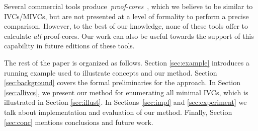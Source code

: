 Several commercial tools produce~\emph{proof-cores}~\cite{hanna2015formal, jasper_gold}, which we believe to be similar to IVCs/MIVCs, but are not presented at a level of formality to perform a precise comparison.  However, to the best of our knowledge, none of these tools offer to calculate \emph{all} proof-cores.  Our work can also be useful towards the support of this capability in future editions of these tools.



The rest of the paper is organized as follows.
Section \ref{sec:example} introduces a running example used to illustrate concepts and our method.
Section \ref{sec:background} covers the formal preliminaries for the approach.
In Section \ref{sec:allivcs}, we present our method for enumerating all minimal IVCs,
which is illustrated in Section \ref{sec:illust}. In Sections~\ref{sec:impl} and \ref{sec:experiment} we talk about implementation and evaluation of our method.
Finally, Section \ref{sec:conc} mentions conclusions and future work. 